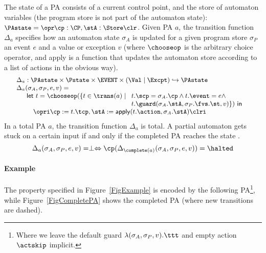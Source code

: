 The state of a PA consists of a current control point, and the store of
automaton variables (the program store is not part of the automaton state):
\({\small
\PAstate = \opr \cp : \CP, \stA : \Store \clr}
\). Given PA \(a\), the transition function \(\Delta_a\) specifies how
an automaton state \(\sigma_A\) is updated for a given program store
\(\sigma_P\) an event \(e\) and a value or exception \(v\) (where
\(\chooseop\) is the arbitrary choice operator, and \textsf{apply} is
a function that updates the automaton store according to a list of
actions in the obvious way).
\[{\small
\begin{array}{l}
\Delta_a  :  \PAstate \times \Pstate \times \EVENT \times (\Val \mid
\Excpt) \hookrightarrow
\PAstate\\
\Delta_a(\sigma_A, \sigma_P, e, v) = \\
\quad
\begin{array}[t]{l}
\mathsf{let\ }t = \chooseop(\{t\in \trans(a)\mid
  \begin{array}[t]{l}
     t.\scp = \sigma_A.\cp \wedge t.\event = e \wedge \\
     t.\guard(\sigma_A.\stA, \sigma_P.\fvs.\st, v)\}) \mathsf{\ in}
  \end{array}\\
\quad \opri \cp := t.\tcp, \stA := \mathsf{apply}(t.\action,
\sigma_A.\stA) \clri
\end{array}

\end{array}}
\]
In a total PA $a$, the transition function \(\Delta_a\) is total.
A partial automaton gets stuck on a certain input if and only if the
completed PA reaches the state \halted.
\vspace*{-.5em}
\begin{equation}\label{PAcompletionProp}
\Delta_a(\sigma_A, \sigma_P, e, v) = \perp \Leftrightarrow
\cp (\Delta_{\complete(a)}(\sigma_A, \sigma_P, e, v)) = \halted
\end{equation}


\paragraph{Example}
The property specified in Figure~\ref{FigExample} is encoded by the
following PA\footnote{Where we leave the default guard
\(\lambda(\sigma_A, \sigma_P, v). \ttt\) and  empty action
\(\actskip\) implicit.}, while Figure~\ref{FigCompletePA} shows the
completed PA (where new transitions are dashed).

